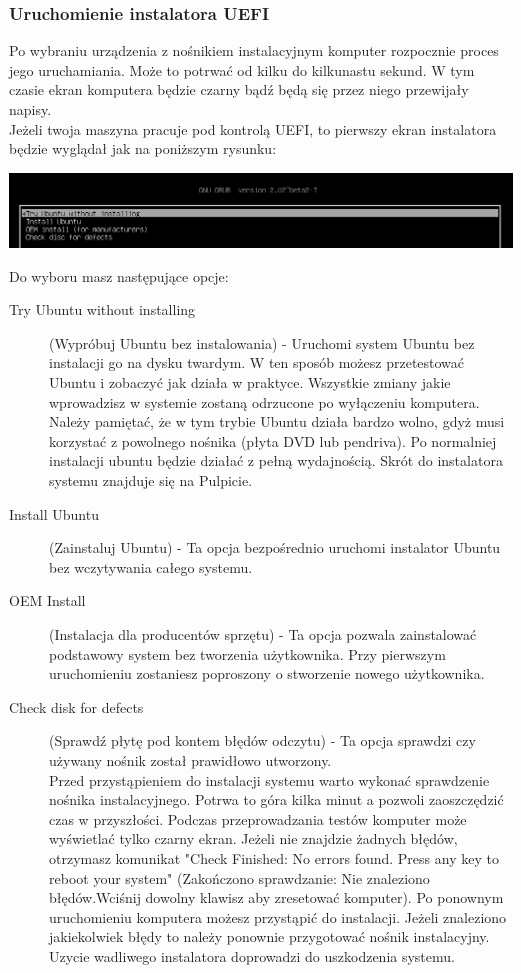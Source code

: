 \subsubsection{Uruchomienie instalatora UEFI}
Po wybraniu urządzenia z nośnikiem instalacyjnym komputer rozpocznie proces jego uruchamiania. Może to potrwać od kilku do kilkunastu sekund. W tym czasie ekran komputera będzie czarny bądź będą się przez niego przewijały napisy.\\
Jeżeli twoja maszyna pracuje pod kontrolą UEFI, to pierwszy ekran instalatora będzie wyglądał jak na poniższym rysunku:
\begin{center}
	\includegraphics[width=\linewidth]{images/instalacja_UEFI_boot.png}
\end{center}
Do wyboru masz następujące opcje:
\begin{description}
\item[Try Ubuntu without installing](Wypróbuj Ubuntu bez instalowania) - Uruchomi system Ubuntu bez instalacji go na dysku twardym. W ten sposób możesz przetestować Ubuntu i zobaczyć jak działa w praktyce. Wszystkie zmiany jakie wprowadzisz w systemie zostaną odrzucone po wyłączeniu komputera. Należy pamiętać, że w tym trybie Ubuntu działa bardzo wolno, gdyż musi korzystać z powolnego nośnika (płyta DVD lub pendriva). Po normalniej instalacji ubuntu będzie działać z pełną wydajnością. Skrót do instalatora systemu znajduje się na Pulpicie.
\item[Install Ubuntu](Zainstaluj Ubuntu) - Ta opcja bezpośrednio uruchomi instalator Ubuntu bez wczytywania całego systemu.
\item[OEM Install](Instalacja dla producentów sprzętu) - Ta opcja pozwala zainstalować podstawowy system bez tworzenia użytkownika. Przy pierwszym uruchomieniu zostaniesz poproszony o stworzenie nowego użytkownika.
\item[Check disk for defects](Sprawdź płytę pod kontem błędów odczytu) - Ta opcja sprawdzi czy używany nośnik został prawidłowo utworzony.\\
Przed przystąpieniem do instalacji systemu warto wykonać sprawdzenie nośnika instalacyjnego. Potrwa to góra kilka minut a pozwoli zaoszczędzić czas w przyszłości. Podczas przeprowadzania testów komputer może wyświetlać tylko czarny ekran. Jeżeli nie znajdzie żadnych błędów, otrzymasz komunikat "Check Finished: No errors found. Press any key to reboot your system" (Zakończono sprawdzanie: Nie znaleziono błędów.Wciśnij dowolny klawisz aby zresetować komputer). Po ponownym uruchomieniu komputera możesz przystąpić do instalacji. Jeżeli znaleziono jakiekolwiek błędy to należy ponownie przygotować nośnik instalacyjny. Uzycie wadliwego instalatora doprowadzi do uszkodzenia systemu. 
\end{description}

